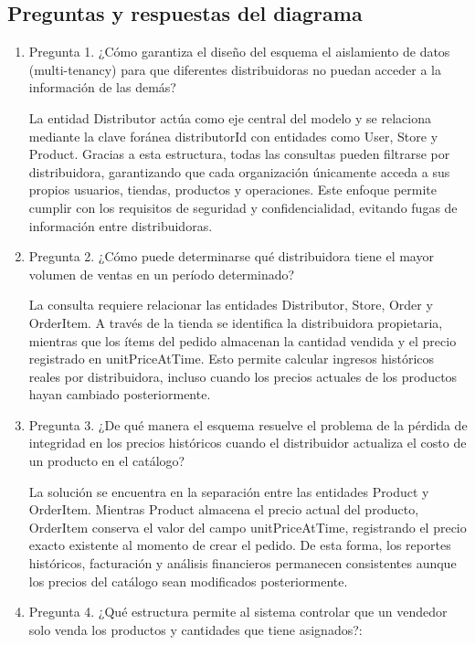 \documentclass[12pt,a4paper]{report}
\begin{document}
\subsection{Preguntas y respuestas del diagrama}
\begin{enumerate}
\item Pregunta 1. ¿Cómo garantiza el diseño del esquema el aislamiento de datos (multi-tenancy) para que diferentes distribuidoras no puedan acceder a la información de las demás?

La entidad Distributor actúa como eje central del modelo y se relaciona mediante la clave foránea distributorId con entidades como User, Store y Product. Gracias a esta estructura, todas las consultas pueden filtrarse por distribuidora, garantizando que cada organización únicamente acceda a sus propios usuarios, tiendas, productos y operaciones. Este enfoque permite cumplir con los requisitos de seguridad y confidencialidad, evitando fugas de información entre distribuidoras.

\item Pregunta 2. ¿Cómo puede determinarse qué distribuidora tiene el mayor volumen de ventas en un período determinado?

La consulta requiere relacionar las entidades Distributor, Store, Order y OrderItem. A través de la tienda se identifica la distribuidora propietaria, mientras que los ítems del pedido almacenan la cantidad vendida y el precio registrado en unitPriceAtTime. Esto permite calcular ingresos históricos reales por distribuidora, incluso cuando los precios actuales de los productos hayan cambiado posteriormente.

\item Pregunta 3. ¿De qué manera el esquema resuelve el problema de la pérdida de integridad en los precios históricos cuando el distribuidor actualiza el costo de un producto en el catálogo?

La solución se encuentra en la separación entre las entidades Product y OrderItem. Mientras Product almacena el precio actual del producto, OrderItem conserva el valor del campo unitPriceAtTime, registrando el precio exacto existente al momento de crear el pedido. De esta forma, los reportes históricos, facturación y análisis financieros permanecen consistentes aunque los precios del catálogo sean modificados posteriormente.

\item Pregunta 4. ¿Qué estructura permite al sistema controlar que un vendedor solo venda los productos y cantidades que tiene asignados?:


\end{enumerate}
\end{document}
